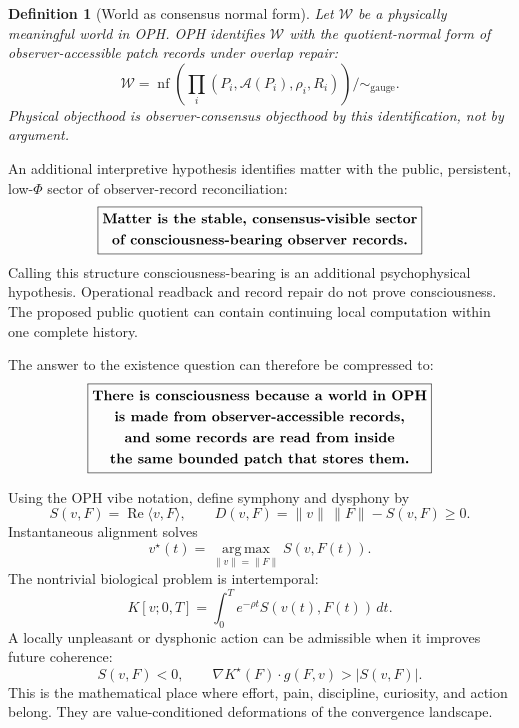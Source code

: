\documentclass[11pt]{article}
\newtheorem{definition}[theorem]{Definition}
\theoremstyle{remark}
\theoremstyle{plain}
\newcommand{\argmax}{\operatorname*{arg\,max}}
\begin{document}
\begin{definition}[World as consensus normal form]
Let \(\mathcal W\) be a physically meaningful world in OPH. OPH identifies \(\mathcal W\) with the quotient-normal form of observer-accessible patch records under overlap repair:
\[
\mathcal W
=
\operatorname{nf}\!\left(
\prod_i (P_i,\mathcal A(P_i),\rho_i,R_i)
\right)\big/\!\sim_{\mathrm{gauge}}.
\]
Physical objecthood is observer-consensus objecthood by this identification, not by argument.
\end{definition}

An additional interpretive hypothesis identifies matter with the public,
persistent, low-\(\Phi\) sector of observer-record reconciliation:
\[
\boxed{
\begin{gathered}
\text{\bfseries Matter is the stable, consensus-visible sector}\\
\text{\bfseries of consciousness-bearing observer records.}
\end{gathered}
}
\]
Calling this structure consciousness-bearing is an additional psychophysical
hypothesis. Operational readback and record repair do not prove consciousness.
The proposed public quotient can contain continuing local computation within
one complete history.

The answer to the existence question can therefore be compressed to:
\[
\boxed{
\begin{gathered}
\text{\bfseries There is consciousness because a world in OPH}\\
\text{\bfseries is made from observer-accessible records,}\\
\text{\bfseries and some records are read from inside}\\
\text{\bfseries the same bounded patch that stores them.}
\end{gathered}
}
\]

Using the OPH vibe notation, define symphony and dysphony by
\[
S(v,F)=\operatorname{Re}\langle v,F\rangle,
\qquad
D(v,F)=\|v\|\,\|F\|-S(v,F)\ge 0.
\]
Instantaneous alignment solves
\[
v^\star(t)=\argmax_{\|v\|=\|F\|}S(v,F(t)).
\]
The nontrivial biological problem is intertemporal:
\[
K[v;0,T]
=
\int_0^T e^{-\rho t}S(v(t),F(t))\,dt.
\]
A locally unpleasant or dysphonic action can be admissible when it improves future coherence:
\[
S(v,F)<0,
\qquad
\nabla K^\star(F)\cdot g(F,v)>|S(v,F)|.
\]
This is the mathematical place where effort, pain, discipline, curiosity, and action belong. They are value-conditioned deformations of the convergence landscape.
\end{document}
